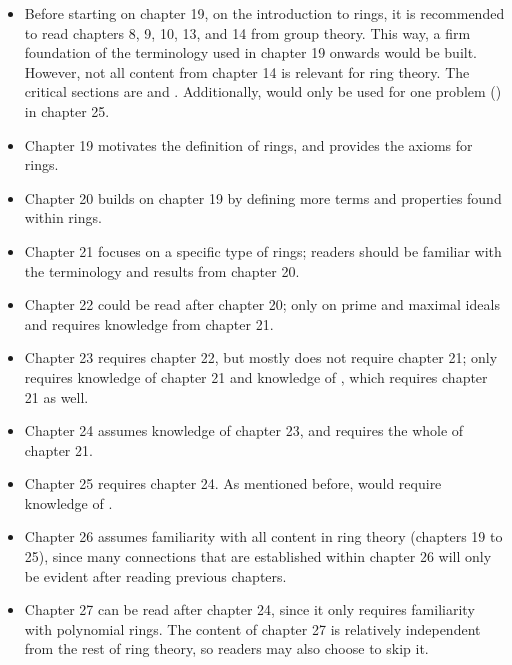 \begin{itemize}
    \begin{itemize}
        \item Before starting on chapter 19, on the introduction to rings, it is recommended to read chapters 8, 9, 10, 13, and 14 from group theory. This way, a firm foundation of the terminology used in chapter 19 onwards would be built. However, not all content from chapter 14 is relevant for ring theory. The critical sections are  and . Additionally,  would only be used for one problem () in chapter 25.
        \item Chapter 19 motivates the definition of rings, and provides the axioms for rings.
        \item Chapter 20 builds on chapter 19 by defining more terms and properties found within rings.
        \item Chapter 21 focuses on a specific type of rings; readers should be familiar with the terminology and results from chapter 20.
        \item Chapter 22 could be read after chapter 20; only  on prime and maximal ideals and  requires knowledge from chapter 21.
        \item Chapter 23 requires chapter 22, but mostly does not require chapter 21; only  requires knowledge of chapter 21 and knowledge of , which requires chapter 21 as well.
        \item Chapter 24 assumes knowledge of chapter 23, and requires the whole of chapter 21.
        \item Chapter 25 requires chapter 24. As mentioned before,  would require knowledge of .
        \item Chapter 26 assumes familiarity with all content in ring theory (chapters 19 to 25), since many connections that are established within chapter 26 will only be evident after reading previous chapters.
        \item Chapter 27 can be read after chapter 24, since it only requires familiarity with polynomial rings. The content of chapter 27 is relatively independent from the rest of ring theory, so readers may also choose to skip it.
    \end{itemize}
\end{itemize}
